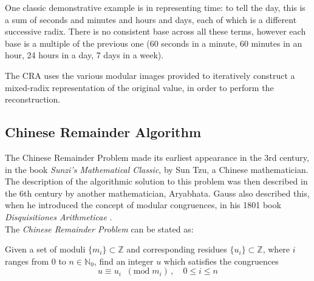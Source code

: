 \documentclass[letterpaper,12pt,titlepage,oneside,final]{book}
\begin{document}
One classic demonstrative example is in representing time: to tell the day, this is a sum of seconds and minutes and hours and days, each of which is a different successive radix.  There is no consistent base across all these terms, however each base is a multiple of the previous one (60 seconds in a minute, 60 minutes in an hour, 24 hours in a day, 7 days in a week).     

The CRA uses the various modular images provided to iteratively construct a mixed-radix representation of the original value, in order to perform the reconstruction.


\subsection{Chinese Remainder Algorithm} 

The Chinese Remainder Problem made its earliest appearance in the 3rd century, in the book \textit{Sunzi's Mathematical Classic}, by Sun Tzu, a Chinese mathematician.  The description of the algorithmic solution to this problem was then described in the 6th century by another mathematician, Aryabhata.  Gauss also described this, when he introduced the concept of modular congruences, in his 1801 book \textit{Disquisitiones Arithmeticae} \cite{Geddes}.  
\\

\noindent The \textit{Chinese Remainder Problem} can be stated as: 
\begin{addmargin}[2em]{2em}%
  Given a set of moduli ${\{m_i\} \subset \mathbb{Z}}$ and corresponding residues ${\{u_i\} \subset \mathbb{Z}}$, where ${i}$ ranges from 0 to ${n \in \mathbb{N}_0}$, find an integer ${u}$ which satisfies the congruences
  \begin{equation*}
    u \equiv u_i \;\; (\textrm{mod} \; m_i)\, ,  \quad 0 \leq i \leq n
  \end{equation*} 
\end{addmargin}
\end{document}
